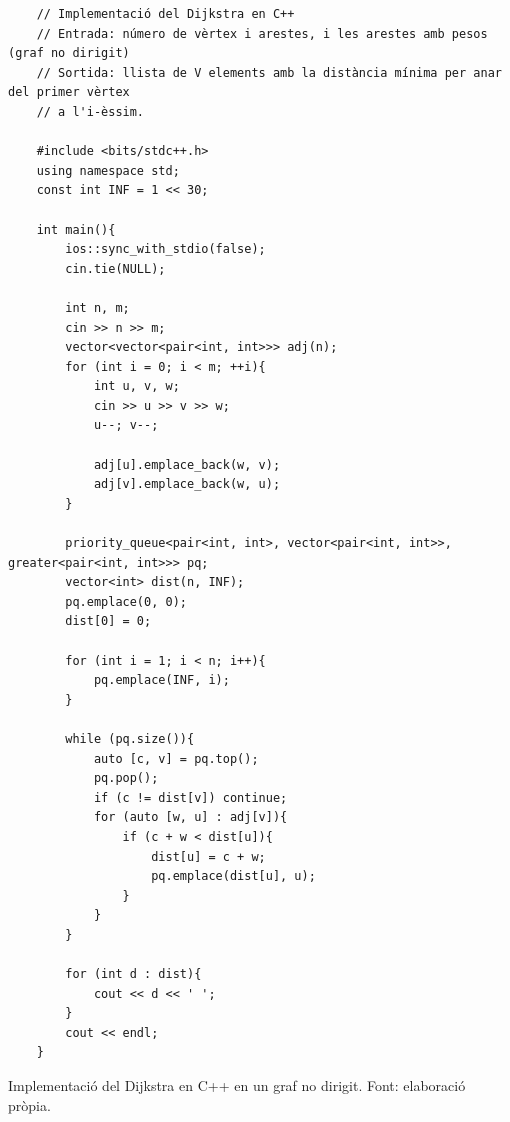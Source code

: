 \begin{longlisting}
    \begin{verbatim}
    // Implementació del Dijkstra en C++
    // Entrada: número de vèrtex i arestes, i les arestes amb pesos (graf no dirigit)
    // Sortida: llista de V elements amb la distància mínima per anar del primer vèrtex 
    // a l'i-èssim.
    
    #include <bits/stdc++.h>
    using namespace std;
    const int INF = 1 << 30;
    
    int main(){
        ios::sync_with_stdio(false);
        cin.tie(NULL);
    
        int n, m;
        cin >> n >> m;
        vector<vector<pair<int, int>>> adj(n);
        for (int i = 0; i < m; ++i){
            int u, v, w;
            cin >> u >> v >> w;
            u--; v--;
    
            adj[u].emplace_back(w, v);
            adj[v].emplace_back(w, u);
        }
    
        priority_queue<pair<int, int>, vector<pair<int, int>>, greater<pair<int, int>>> pq;
        vector<int> dist(n, INF);
        pq.emplace(0, 0);
        dist[0] = 0;
    
        for (int i = 1; i < n; i++){
            pq.emplace(INF, i);
        }
    
        while (pq.size()){
            auto [c, v] = pq.top();
            pq.pop();
            if (c != dist[v]) continue;
            for (auto [w, u] : adj[v]){
                if (c + w < dist[u]){
                    dist[u] = c + w;
                    pq.emplace(dist[u], u);
                }
            }
        }
    
        for (int d : dist){
            cout << d << ' ';
        }
        cout << endl;
    }
    \end{verbatim}
    \caption[Implementació del Dijkstra en C++ en un graf no dirigit.]{Implementació del Dijkstra en C++ en un graf no dirigit. Font: elaboració pròpia.}
    \label{Figura}
\end{longlisting}%


